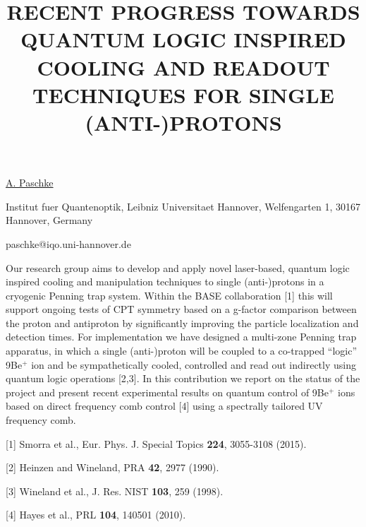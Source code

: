 \title{RECENT PROGRESS TOWARDS QUANTUM LOGIC INSPIRED COOLING AND READOUT TECHNIQUES FOR SINGLE (ANTI-)PROTONS}

\underline{A. Paschke} 

{\normalsize{\vspace{-4mm}
Institut fuer Quantenoptik,
Leibniz Universitaet Hannover,
Welfengarten 1,
30167 Hannover,
Germany

\email paschke@iqo.uni-hannover.de}}

Our research group aims to develop and apply novel laser-based, quantum logic inspired cooling and manipulation techniques to single (anti-)protons in a cryogenic Penning trap system. Within the BASE collaboration [1] this will support ongoing tests of CPT symmetry based on a g-factor comparison between the proton and antiproton by significantly improving the particle localization and detection times. For implementation we have designed a multi-zone Penning trap apparatus, in which a single (anti-)proton will be coupled to a co-trapped ``logic'' 9Be$^+$ ion and be sympathetically cooled, controlled and read out indirectly using quantum logic operations [2,3].
In this contribution we report on the status of the project and present recent experimental results on quantum control of 9Be$^+$ ions based on direct frequency comb control [4] using a spectrally tailored UV frequency comb.

{\normalsize
[1] Smorra et al., Eur. Phys. J. Special Topics \textbf{224}, 3055-3108 (2015).
\vsp

[2] Heinzen and Wineland, PRA \textbf{42}, 2977 (1990).
\vsp

[3] Wineland et al., J. Res. NIST \textbf{103}, 259 (1998).
\vsp

[4] Hayes et al., PRL \textbf{104}, 140501 (2010).
}

\vspace{\baselineskip} 
